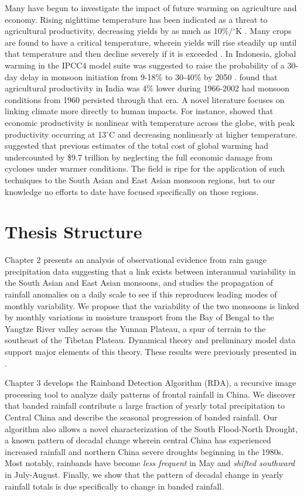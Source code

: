 	Many have begun to investigate the impact of future warming on agriculture and economy. Rising nighttime temperature has been indicated as a threat to agricultural productivity, decreasing yields by as much as 10\%/$^{\circ}$K \citep{Peng2004}. Many crops are found to have a critical temperature, wherein yields will rise steadily up until that temperature and then decline severely if it is exceeded \citep{Schlenker2009}. In Indonesia, global warming in the IPCC4 model suite was suggested to raise the probability of a 30-day delay in monsoon initiation from 9-18\% to 30-40\% by 2050 \citep{Naylor2007}. \citet{Auffhammer2012} found that agricultural productivity in India was 4\% lower during 1966-2002 had monsoon conditions from 1960 persisted through that era. A novel literature focuses on linking climate more directly to human impacts. For instance, \citet{Burke2015} showed that economic productivity is nonlinear with temperature across the globe, with peak productivity occurring at 13$^{\circ}$C and decreasing nonlinearly at higher temperature. \citet{Hsiang2014} suggested that previous estimates of the total cost of global warming had undercounted by \$9.7 trillion by neglecting the full economic damage from cyclones under warmer conditions. The field is ripe for the application of such techniques to the South Asian and East Asian monsoon regions, but to our knowledge no efforts to date have focused specifically on those regions.

\section{Thesis Structure}

	Chapter 2 presents an analysis of observational evidence from rain gauge precipitation data suggesting that a link exists between interannual variability in the South Asian and East Asian monsoons, and studies the propagation of rainfall anomalies on a daily scale to see if this reproduces leading modes of monthly variability. We propose that the variability of the two monsoons is linked by monthly variations in moisture transport from the Bay of Bengal to the Yangtze River valley across the Yunnan Plateau, a spur of terrain to the southeast of the Tibetan Plateau. Dynamical theory and preliminary model data support major elements of this theory. These results were previously presented in \citet{Day2015}.

	Chapter 3 develops the Rainband Detection Algorithm (RDA), a recursive image processing tool to analyze daily patterns of frontal rainfall in China. We discover that banded rainfall contribute a large fraction of yearly total precipitation to Central China and describe the seasonal progression of banded rainfall. Our algorithm also allows a novel characterization of the South Flood-North Drought, a known pattern of decadal change wherein central China has experienced increased rainfall and northern China severe droughts beginning in the 1980s. Most notably, rainbands have become \textit{less frequent} in May and \textit{shifted southward} in July-August. Finally, we show that the pattern of decadal change in yearly rainfall totals is due specifically to change in banded rainfall.

